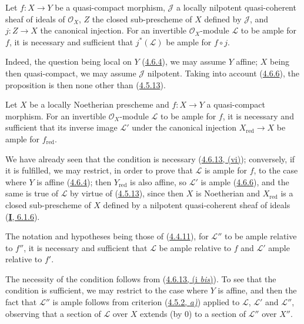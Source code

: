 \begin{proposition}[4.6.15]
\label{II.4.6.15}
Let $f:X\to Y$ be a quasi-compact morphism, $\mathcal{J}$ a locally
nilpotent quasi-coherent sheaf of ideals of $\mathcal{O}_X$, $Z$ the
closed sub-prescheme of $X$ defined by $\mathcal{J}$, and $j:Z\to X$
the canonical injection. For an invertible $\mathcal{O}_X$-module
$\mathcal{L}$ to be ample for $f$, it is necessary and sufficient that
$j^*(\mathcal{L})$ be ample for $f\circ j$.
\end{proposition}

Indeed, the question being local on $Y$
(\hyperref[II.4.6.4]{4.6.4}), we may assume $Y$ affine; $X$ being
then quasi-compact, we may assume $\mathcal{J}$ nilpotent. Taking into account
(\hyperref[II.4.6.6]{4.6.6}), the proposition is then none other than
(\hyperref[II.4.5.13]{4.5.13}).

\begin{corollary}[4.6.16]
\label{II.4.6.16}
Let $X$ be a locally Noetherian prescheme and $f:X\to Y$ a quasi-compact
morphism. For an invertible $\mathcal{O}_X$-module $\mathcal{L}$
to be ample for $f$, it is necessary and sufficient that its inverse image
$\mathcal{L}'$ under the canonical injection $X_{\mathrm{red}}\to X$ be ample
for $f_{\mathrm{red}}$.
\end{corollary}

We have already seen that the condition is necessary
(\hyperref[II.4.6.13]{4.6.13, (vi)}); conversely, if it is fulfilled,
we may restrict, in order to prove that $\mathcal{L}$ is ample for $f$, to the
case where $Y$ is affine (\hyperref[II.4.6.4]{4.6.4}); then
$Y_{\mathrm{red}}$ is also affine, so $\mathcal{L}'$ is ample
(\hyperref[II.4.6.6]{4.6.6}), and the same is true of $\mathcal{L}$ by
virtue of (\hyperref[II.4.5.13]{4.5.13}), since then $X$ is
Noetherian and $X_{\mathrm{red}}$ is a closed sub-prescheme of $X$ defined by
a nilpotent quasi-coherent sheaf of ideals
(\hyperref[I.6.1.6]{\textbf{I}, 6.1.6}).

\begin{proposition}[4.6.17]
\label{II.4.6.17}
The notation and hypotheses being those of
\textup{(\hyperref[II.4.4.11]{4.4.11})}, for $\mathcal{L}''$ to be ample
relative to $f''$, it is necessary and sufficient that $\mathcal{L}$ be ample
relative to $f$ and $\mathcal{L}'$ ample relative to $f'$.
\end{proposition}


The necessity of the condition follows from
(\hyperref[II.4.6.13]{4.6.13, (i \emph{bis})}). To see that the condition is
sufficient, we may restrict to the case where $Y$ is affine, and then the fact
that $\mathcal{L}''$ is ample follows from criterion
(\hyperref[II.4.5.2]{4.5.2, \emph{a)}}) applied to $\mathcal{L}$,
$\mathcal{L}'$ and $\mathcal{L}''$, observing that a section of
$\mathcal{L}$ over $X$ extends (by $0$) to a section of
$\mathcal{L}''$ over $X''$.

